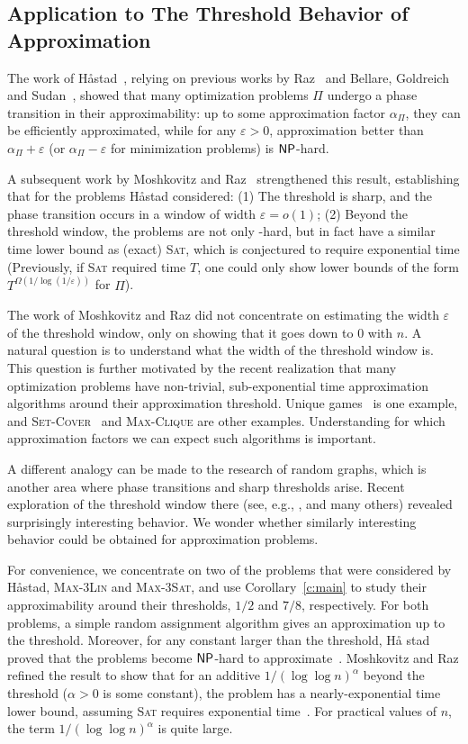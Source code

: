 \subsection{Application to The Threshold Behavior of Approximation}

The work of H\aa stad~\cite{Has97}, relying on previous works by Raz~\cite{Raz} and Bellare, Goldreich and Sudan~\cite{BGS}, showed that many optimization problems $\Pi$ undergo a phase transition in their approximability: up to some approximation factor $\alpha_{\Pi}$, they can be efficiently approximated, while for any $\varepsilon > 0$, approximation better than $\alpha_{\Pi} + \varepsilon$ (or $\alpha_{\Pi}-\varepsilon$ for minimization problems) is ${\sf {\sf NP}}$-hard.

A subsequent work by Moshkovitz and Raz~\cite{MR08} strengthened this result, establishing that for the problems H\aa stad considered: (1) The threshold is sharp, and the phase transition occurs in a window of width $\varepsilon = o(1)$; (2) Beyond the threshold window, the problems are not only {}-hard, but in fact have a similar time lower bound as (exact) \textsc{Sat}, which is conjectured to require exponential time (Previously, if \textsc{Sat} required time $T$, one could only show lower bounds of the form $T^{\Omega(1/\log(1/\varepsilon))}$ for $\Pi$).

The work of Moshkovitz and Raz did not concentrate on estimating the width $\varepsilon$ of the threshold window, only on showing that it goes down to $0$ with $n$. A natural question is to understand what the width of the threshold window is. This question is further motivated by the recent realization that many optimization problems have non-trivial, sub-exponential time approximation algorithms around their approximation threshold. Unique games~\cite{ABS} is one example, and \textsc{Set-Cover}~\cite{CKW} and \textsc{Max-Clique} are other examples. Understanding for which approximation factors we can expect such algorithms is important.

A different analogy can be made to the research of random graphs, which is another area where phase transitions and sharp thresholds arise. Recent exploration of the threshold window there (see, e.g., \cite{BBCKW}, and many others) revealed surprisingly interesting behavior.
We wonder whether similarly interesting behavior could be obtained for approximation problems.

For convenience, we concentrate on two of the problems that were considered by H\aa stad,
\textsc{Max-3Lin} and \textsc{Max-3Sat}, and use Corollary~\ref{c:main} to study their approximability around their thresholds,
${1}/{2}$ and ${7}/{8}$, respectively.  For both problems, a simple
random assignment algorithm gives an approximation up to the
threshold. Moreover, for any constant larger than the threshold, H\aa
stad proved that the problems become ${\sf {\sf NP}}$-hard to
approximate~\cite{Has97}. Moshkovitz and Raz refined the result to
show that for an additive $1/(\log\log n)^{\alpha}$ beyond the
threshold ($\alpha>0$ is some constant), the problem has a
nearly-exponential time lower bound, assuming \textsc{Sat} requires
exponential time~\cite{MR08}. For practical values of $n$, the term $1/(\log\log n)^{\alpha}$ is quite large.

